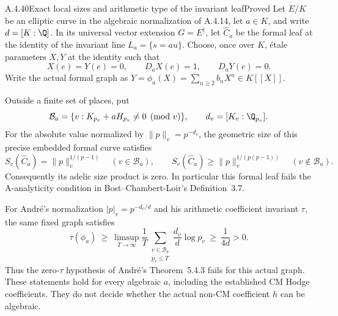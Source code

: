 \begin{result}{A.4.40}{Exact local sizes and arithmetic type of the invariant leaf}{Proved}
Let $E/K$ be an elliptic curve in the algebraic normalization of
A.4.14, let $a\in K$, and write $d=[K:\Q]$.  In its universal vector
extension $G=E^\dagger$, let $\widehat C_a$ be the formal leaf at the
identity of the invariant line $L_a=\{s=au\}$.  Choose, once over $K$,
\'etale parameters $X,Y$ at the identity such that
\[
 X(e)=Y(e)=0,\qquad D_aX(e)=1,\qquad D_aY(e)=0.
 \tag{A.4.40a}
\]
Write the actual formal graph as
$Y=\phi_a(X)=\sum_{n\ge2}b_nX^n\in K[[X]]$.

Outside a finite set of places, put
\[
 \mathcal B_a=\{v:K_{p_v}+aH_{p_v}\ne0\pmod v\},\qquad
 d_v=[K_v:\Q_{p_v}].
\]
For the absolute value normalized by $\|p\|_v=p^{-d_v}$, the geometric
size of this precise embedded formal curve satisfies
\[
 S_v(\widehat C_a)=\|p\|_v^{1/(p-1)}\quad(v\in\mathcal B_a),
 \qquad
 S_v(\widehat C_a)\ge\|p\|_v^{1/(p(p-1))}
       \quad(v\notin\mathcal B_a).
 \tag{A.4.40b}
\]
Consequently its adelic size product is zero.  In particular this
formal leaf fails the A-analyticity condition in Bost--Chambert-Loir's
Definition~3.7.

For Andr\'e's normalization $|p|_v=p^{-d_v/d}$ and his arithmetic
coefficient invariant $\tau$, the same fixed graph satisfies
\[
 \tau(\phi_a)\ \ge\
 \limsup_{T\to\infty}\frac1T
       \sum_{\substack{v\in\mathcal B_a\\p_v\le T}}
                       \frac{d_v}{d}\log p_v
 \ \ge\ \frac1{4d}>0.
 \tag{A.4.40c}
\]
Thus the zero-$\tau$ hypothesis of Andr\'e's Theorem~5.4.3 fails for
this actual graph.  These statements hold for every algebraic $a$,
including the established CM Hodge coefficients.  They do not decide
whether the actual non-CM coefficient $h$ can be algebraic.
\end{result}

